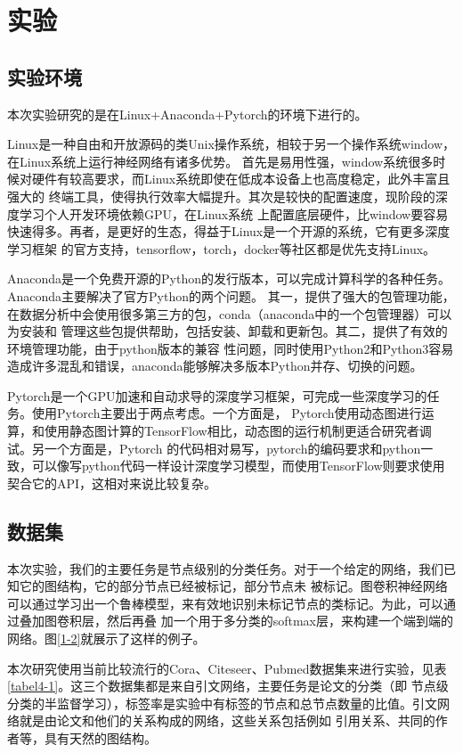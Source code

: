 \cleardoublepage

\section{实验}
\subsection{实验环境}
本次实验研究的是在Linux+Anaconda+Pytorch的环境下进行的。

Linux是一种自由和开放源码的类Unix操作系统，相较于另一个操作系统window，在Linux系统上运行神经网络有诸多优势。
首先是易用性强，window系统很多时候对硬件有较高要求，而Linux系统即使在低成本设备上也高度稳定，此外丰富且强大的
终端工具，使得执行效率大幅提升。其次是较快的配置速度，现阶段的深度学习个人开发环境依赖GPU，在Linux系统
上配置底层硬件，比window要容易快速得多。再者，是更好的生态，得益于Linux是一个开源的系统，它有更多深度学习框架
的官方支持，tensorflow，torch，docker等社区都是优先支持Linux。

Anaconda是一个免费开源的Python的发行版本，可以完成计算科学的各种任务。Anaconda主要解决了官方Python的两个问题。
其一，提供了强大的包管理功能，在数据分析中会使用很多第三方的包，conda（anaconda中的一个包管理器）可以为安装和
管理这些包提供帮助，包括安装、卸载和更新包。其二，提供了有效的环境管理功能，由于python版本的兼容
性问题，同时使用Python2和Python3容易造成许多混乱和错误，anaconda能够解决多版本Python并存、切换的问题。

Pytorch是一个GPU加速和自动求导的深度学习框架，可完成一些深度学习的任务。使用Pytorch主要出于两点考虑。一个方面是，
Pytorch使用动态图进行运算，和使用静态图计算的TensorFlow相比，动态图的运行机制更适合研究者调试。另一个方面是，Pytorch
的代码相对易写，pytorch的编码要求和python一致，可以像写python代码一样设计深度学习模型，而使用TensorFlow则要求使用
契合它的API，这相对来说比较复杂。

\subsection{数据集}
本次实验，我们的主要任务是节点级别的分类任务。对于一个给定的网络，我们已知它的图结构，它的部分节点已经被标记，部分节点未
被标记。图卷积神经网络可以通过学习出一个鲁棒模型，来有效地识别未标记节点的类标记。为此，可以通过叠加图卷积层，然后再叠
加一个用于多分类的softmax层，来构建一个端到端的网络。图\ref{1-2}就展示了这样的例子。

本次研究使用当前比较流行的Cora、Citeseer、Pubmed数据集来进行实验，见表\ref{tabel4-1}。这三个数据集都是来自引文网络，主要任务是论文的分类（即
节点级分类的半监督学习），标签率是实验中有标签的节点和总节点数量的比值。引文网络就是由论文和他们的关系构成的网络，这些关系包括例如
引用关系、共同的作者等，具有天然的图结构。

